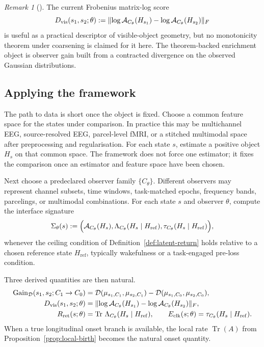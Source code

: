 \documentclass[11pt,a4paper]{article}
\numberwithin{equation}{section}
\DeclarePairedDelimiter{\norm}{\lVert}{\rVert}
\DeclareMathOperator{\Tr}{Tr}
\newcommand{\Aobs}{\mathcal A}
\theoremstyle{thmcompact}
\theoremstyle{remark}
\newtheorem*{remarkplain}{Remark}
\newenvironment{remark}[1][]%
{\begin{remarkbox}\begin{remarkplain}[#1]\normalfont}
{\end{remarkplain}\end{remarkbox}}
\begin{document}
\begin{remark}
The current Frobenius matrix-log score
\[
D_{\mathrm{vis}}(s_1,s_2;\theta):=\norm{\log\Aobs_{C_\theta}(H_{s_1})-\log\Aobs_{C_\theta}(H_{s_2})}_F
\]
is useful as a practical descriptor of visible-object geometry, but no monotonicity theorem under coarsening is claimed for it here. The theorem-backed enrichment object is observer gain built from a contracted divergence on the observed Gaussian distributions.
\end{remark}

\subsection{Applying the framework}

The path to data is short once the object is fixed. Choose a common feature space for the states under comparison. In practice this may be multichannel EEG, source-resolved EEG, parcel-level fMRI, or a stitched multimodal space after preprocessing and regularisation. For each state \(s\), estimate a positive object \(H_s\) on that common space. The framework does not force one estimator; it fixes the comparison once an estimator and feature space have been chosen.

Next choose a predeclared observer family \(\{C_\theta\}\). Different observers may represent channel subsets, time windows, task-matched epochs, frequency bands, parcelings, or multimodal combinations. For each state \(s\) and observer \(\theta\), compute the interface signature
\[
\Sigma_\theta(s):=
\Bigl(
\Aobs_{C_\theta}(H_s),
\Lambda_{C_\theta}(H_s\mid H_{\mathrm{ref}}),
\tau_{C_\theta}(H_s\mid H_{\mathrm{ref}})
\Bigr),
\]
whenever the ceiling condition of Definition~\ref{def:latent-return} holds relative to a chosen reference state \(H_{\mathrm{ref}}\), typically wakefulness or a task-engaged pre-loss condition.

Three derived quantities are then natural.
\begin{align}
\operatorname{Gain}_{\mathcal D}(s_1,s_2;C_1\to C_0)
&=
\mathcal D(\mu_{s_1,C_1},\mu_{s_2,C_1})
-
\mathcal D(\mu_{s_1,C_0},\mu_{s_2,C_0}), \\
D_{\mathrm{vis}}(s_1,s_2;\theta)
&=
\norm{\log\Aobs_{C_\theta}(H_{s_1})-\log\Aobs_{C_\theta}(H_{s_2})}_F, \\
R_{\mathrm{ret}}(s;\theta)
&=
\Tr\,\Lambda_{C_\theta}(H_s\mid H_{\mathrm{ref}}),
\qquad
E_{\mathrm{clk}}(s;\theta)
=
\tau_{C_\theta}(H_s\mid H_{\mathrm{ref}}).
\end{align}
When a true longitudinal onset branch is available, the local rate \(\Tr(A)\) from Proposition~\ref{prop:local-birth} becomes the natural onset quantity.
\end{document}
